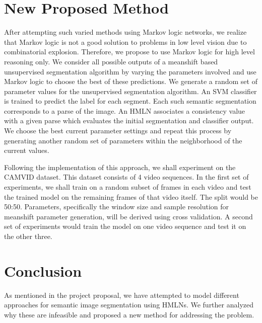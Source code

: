 \documentclass{article} %
\begin{document}
\section{New Proposed Method}
\label{sec:New}
After attempting such varied methods using Markov logic networks, we realize that Markov logic is not a good solution to problems in low level vision due to combinatorial explosion. Therefore, we propose to use Markov logic for high level reasoning only. We consider all possible outputs of a meanshift based unsupervised segmentation algorithm by varying the parameters involved and use Markov logic to choose the best of these predictions. We generate a random set of parameter values for the unsupervised segmentation algorithm. An SVM classifier is trained to predict the label for each segment. Each such semantic segmentation corresponds to a parse of the image. An HMLN associates a consistency value with a given parse which evaluates the initial segmentation and classifier output. We choose the best current parameter settings and repeat this process by generating another random set of parameters within the neighborhood of the current values.  

Following the implementation of this approach, we shall experiment on the CAMVID dataset. This dataset consists of 4 video sequences. In the first set of experiments, we shall train on a random subset of frames in each video and test the trained model on the remaining frames of that video itself. The split would be 50:50. Parameters, specifically the window size and sample resolution for meanshift parameter generation, will be derived using cross validation. A second set of experiments would train the model on one video sequence and test it on the other three.


\section{Conclusion}
\label{sec:Conclusion}

As mentioned in the project proposal, we have attempted to model different approaches for semantic image segmentation using HMLNs. We further analyzed why these are infeasible and proposed a new method for addressing the problem.



\end{document}
